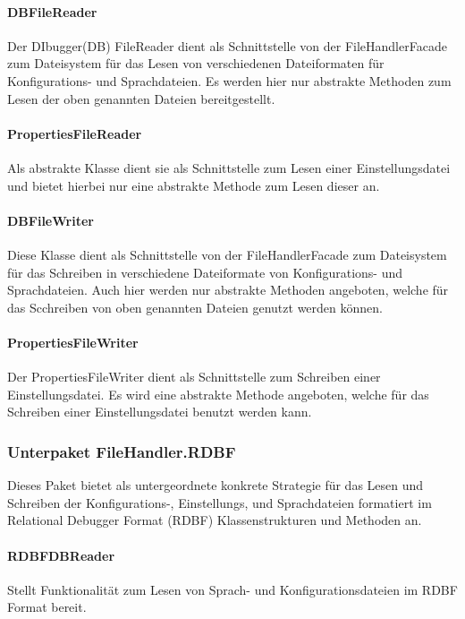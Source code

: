 \documentclass[parskip=full]{scrartcl}
\begin{document}
\paragraph{DBFileReader}
Der DIbugger(DB) FileReader dient als Schnittstelle von der FileHandlerFacade zum Dateisystem für das Lesen von verschiedenen Dateiformaten für Konfigurations- und Sprachdateien.
Es werden hier nur abstrakte Methoden zum Lesen der oben genannten Dateien bereitgestellt.
\paragraph{PropertiesFileReader}
Als abstrakte Klasse dient sie als Schnittstelle zum Lesen einer Einstellungsdatei und bietet hierbei nur eine abstrakte Methode zum Lesen dieser an.
\paragraph{DBFileWriter}
Diese Klasse dient als Schnittstelle von der FileHandlerFacade zum Dateisystem für das Schreiben in verschiedene Dateiformate von Konfigurations- und Sprachdateien.
Auch hier werden nur abstrakte Methoden angeboten, welche für das Scchreiben von oben genannten Dateien genutzt werden können.
\paragraph{PropertiesFileWriter}
Der PropertiesFileWriter dient als Schnittstelle zum Schreiben einer Einstellungsdatei.
Es wird eine abstrakte Methode angeboten, welche für das Schreiben einer Einstellungsdatei benutzt werden kann.
\subsubsection{Unterpaket FileHandler.RDBF}
Dieses Paket bietet als untergeordnete konkrete Strategie für das Lesen und Schreiben der Konfigurations-, Einstellungs, und Sprachdateien formatiert im Relational Debugger Format (RDBF) Klassenstrukturen und Methoden an.
\paragraph{RDBFDBReader}
Stellt Funktionalität zum Lesen von Sprach- und Konfigurationsdateien im RDBF Format bereit.
\end{document}
